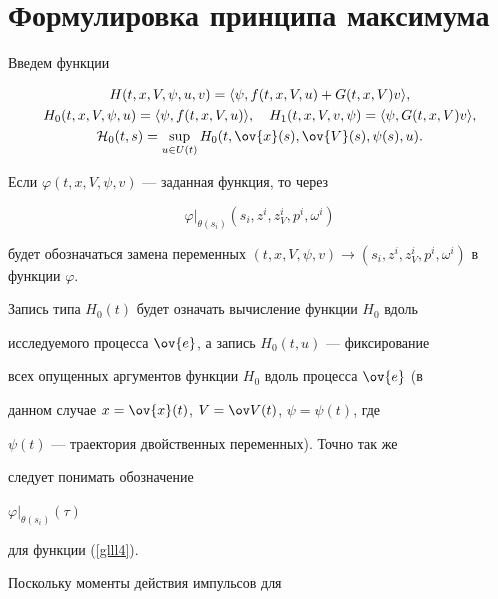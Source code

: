 \section{Формулировка принципа максимума}





Введем функции


\begin{gather*}


H(t,x,V,\psi,u,v)=\la\psi,f(t,x,V,u)+G(t,x,V)v\ra,\\


H_{0}(t,x,V,\psi,u)=\la\psi,f(t,x,V,u)\ra,\quad


H_1(t,x,V,v,\psi)=\la\psi,G(t,x,V)v\ra, \\


{\cal H}_0(t,s)= \sup_{u \in U(t)}


H_0(t,\ov{x}(s),\ov{V}(s),\psi(s),u).


\end{gather*}


Если $\varphi (t,x,V,\psi,v)$ --- заданная функция, то через


\begin{equation}


\varphi|_{\theta(s_i)}(s_i,z^i,z_V^i,p^i,\omega^i)


\label{glll4}


\end{equation}


будет обозначаться замена переменных $(t,x,V,\psi,v) \rightarrow


(s_i,z^i,z_V^i,p^i,\omega^i)$ в функции $\varphi$.


Запись типа $H_0(t)$ будет означать вычисление функции $H_0$ вдоль


исследуемого процесса $\ov{e}$, а запись $H_0(t,u)$ --- фиксирование


всех опущенных аргументов функции $H_0$ вдоль процесса $\ov{e}$ (в


данном случае $x=\ov{x}(t)$, $V=\ov V(t)$, $\psi=\psi(t)$, где


$\psi(t)$ --- траектория двойственных переменных). Точно так же


следует понимать обозначение


$\varphi |_{\theta(s_i)}(\tau)$


для функции (\ref{glll4}).





Поскольку моменты действия импульсов для


